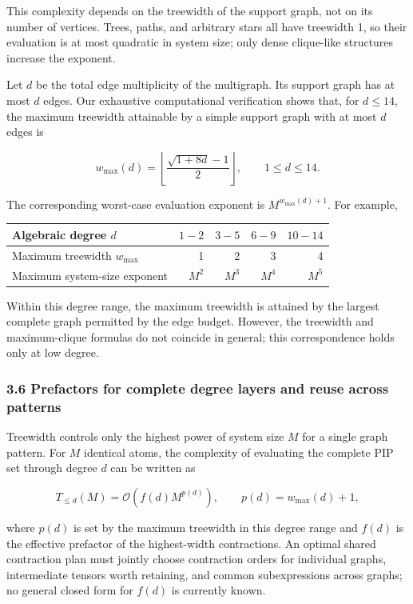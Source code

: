 This complexity depends on the treewidth of the support graph, not on its number of vertices. Trees, paths, and arbitrary stars all have treewidth 1, so their evaluation is at most quadratic in system size; only dense clique-like structures increase the exponent.

Let \(d\) be the total edge multiplicity of the multigraph. Its support graph has at most \(d\) edges. 
Our exhaustive computational verification shows that\cite{Arnborg1990Partial3Trees,McKayPiperno2014Nauty,McKayGraphData}, 
for \(d\le14\), the maximum treewidth attainable by a simple support graph with at most \(d\) edges is

\[
\boxed{
w_{\max}(d)
=
\left\lfloor
\frac{\sqrt{1+8d}-1}{2}
\right\rfloor ,
\qquad 1\le d\le14 .
}
\]

The corresponding worst-case evaluation exponent is \(M^{w_{\max}(d)+1}\). For example,

\begin{longtable}[]{@{}lrrrr@{}}
\toprule\noalign{}
Algebraic degree \(d\) & \(1\!-\!2\) & \(3\!-\!5\) & \(6\!-\!9\) & \(10\!-\!14\) \\
\midrule\noalign{}
\endhead
\bottomrule\noalign{}
\endlastfoot
Maximum treewidth \(w_{\max}\) & 1 & 2 & 3 & 4 \\
Maximum system-size exponent & \(M^2\) & \(M^3\) & \(M^4\) & \(M^5\) \\
\end{longtable}

Within this degree range, the maximum treewidth is attained by the largest complete graph permitted by the edge budget. 
However, the treewidth and maximum-clique formulas do not coincide in general; this correspondence holds only at low degree.

\subsubsection{3.6 Prefactors for complete degree layers and reuse across patterns}\label{sec:prefactors}

Treewidth controls only the highest power of system size \(M\) for a single graph pattern. For \(M\) identical atoms, the complexity of evaluating the complete PIP set through degree \(d\) can be written as

\[
T_{\le d}(M)=\mathcal O\!\left(f(d)M^{p(d)}\right),
\qquad
p(d)=w_{\max}(d)+1,
\]

where \(p(d)\) is set by the maximum treewidth in this degree range and \(f(d)\) is the effective prefactor of the highest-width contractions. An optimal shared contraction plan must jointly choose contraction orders for individual graphs, intermediate tensors worth retaining, and common subexpressions across graphs; no general closed form for \(f(d)\) is currently known.

